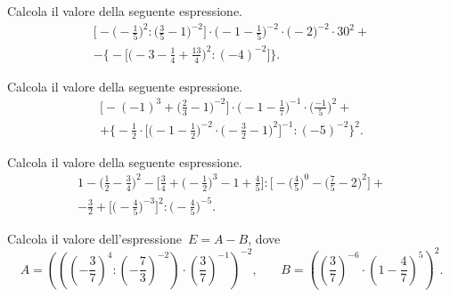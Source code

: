 \begin{esercizio}[\Ast]
 Calcola il valore della seguente espressione.
\begin{multline*}
\bigg[-\bigg(-{\frac{1}{5}}\bigg)^{2}:\bigg(\frac{3}{5}-1\bigg)^{-2}\bigg]\cdot%
\bigg(-1-\frac{1}{5}\bigg)^{-2}\cdot \bigg(-2\bigg)^{-2}\cdot30^{2}+\\%
-\bigg\{-\bigg[\bigg(-3-\frac{1}{4}+\frac{13}{4}\bigg)^{2}:(-4)^{-2}\bigg]\bigg\}.
\end{multline*}
\end{esercizio}

\begin{esercizio}[\Ast]
 Calcola il valore della seguente espressione.
\begin{multline*}
\bigg[-(-1)^{3}+\bigg(\frac{2}{3}-1\bigg)^{-2}\bigg]\cdot\bigg(-1-\frac{1}{7}\bigg)^{-1}\cdot%
\bigg(\frac{-1}{5}\bigg)^{2}+\\%
+\bigg\{-{\frac{1}{2}}\cdot\bigg[\bigg(-1-\frac{1}{2}\bigg)^{-2}\cdot%
\bigg(-{\frac{3}{2}}-1\bigg)^{2}\bigg]^{-1}:(-5)^{-2}\bigg\}^{2}.
\end{multline*}
\end{esercizio}

\begin{esercizio}[\Ast]
 Calcola il valore della seguente espressione.
\begin{multline*}
1-\bigg(\frac{1}{2}-\frac{3}{4}\bigg)^{2}-\bigg[\frac{3}{4}+\bigg(-{\frac{1}{2}}\bigg)^{3}-1+\frac{4}{5}\bigg]:%
\bigg[-\bigg(\frac{4}{5}\bigg)^{0}-\bigg(\frac{7}{5}-2\bigg)^{2}\bigg]+\\%
-\frac{3}{2}+\bigg[\bigg(-{\frac{4}{5}}\bigg)^{-3}\bigg]^{2}:\bigg(-{\frac{4}{5}}\bigg)^{-5}.
\end{multline*}
\end{esercizio}

\begin{esercizio}
Calcola il valore dell'espressione~$E = A- B$, dove
\[A=\left(\left(\left(-{\frac{3}{7}}\right)^{4}:\left(-{\frac{7}{3}}\right)^{-2}\right)\cdot%
\left(\frac{3}{7}\right)^{-1}\right)^{-2}\text{,}\qquad
B=\left(\left(\frac{3}{7}\right)^{-6}\cdot%
\left(1-\frac{4}{7}\right)^{5}\right)^{2}.\]
 \end{esercizio}

